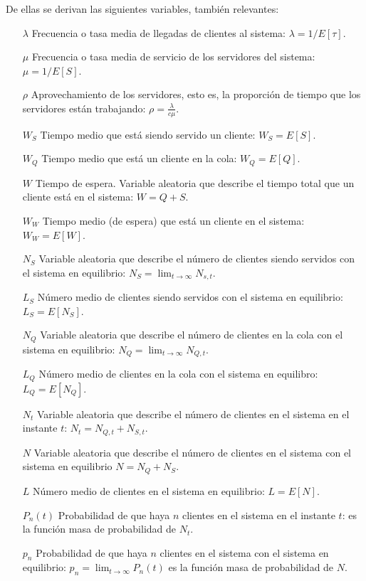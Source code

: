 \documentclass[a4paper,10pt]{scrartcl}
\theoremstyle{definition}
\theoremstyle{definition}
\numberwithin{equation}{section}
\begin{document}
	De ellas se derivan las siguientes variables, también relevantes:
	\begin{itemize}
		\item [$\lambda$]
		Frecuencia o tasa media de llegadas de clientes al sistema: $\lambda = 1/E[\tau]$.
		\item [$\mu$]
		Frecuencia o tasa media de servicio de los servidores del sistema: $\mu = 1/E[S]$.
		\item [$\rho$]
		Aprovechamiento de los servidores, esto es, la proporción de tiempo que los servidores están trabajando: $\rho = \frac{\lambda}{c\mu}$.
		\item [$W_S$]
		Tiempo medio que está siendo servido un cliente: $W_S  = E[S]$.
		\item [$W_Q$]
		Tiempo medio que está un cliente en la cola: $W_Q = E[Q]$.
		\item [$W$]
		Tiempo de espera. Variable aleatoria que describe el tiempo total que un cliente está en el sistema: $W = Q+S$.
		\item [$W_W$]
		Tiempo medio (de espera) que está un cliente en el sistema: $W_W = E[W]$.
		\item [$N_S$]
		Variable aleatoria que describe el número de clientes siendo servidos con el sistema en equilibrio: $N_S = \lim_{t \rightarrow \infty} N_{s,t}$.
		\item [$L_S$]
		Número medio de clientes siendo servidos con el sistema en equilibrio: \\ $L_S = E[N_S]$.
		\item [$N_Q$]
		Variable aleatoria que describe el número de clientes en la cola con el sistema en equilibrio: $N_Q = \lim_{t \rightarrow \infty} N_{Q,t}$.
		\item [$L_Q$]
		Número medio de clientes en la cola con el sistema en equilibro: $L_Q = E[N_Q]$.
		\item [$N_t$]
		Variable aleatoria que describe el número de clientes en el sistema en el instante $t$: $N_t = N_{Q,t} + N_{S,t}$.
		\item [$N$]
		Variable aleatoria que describe el número de clientes en el sistema con el sistema en equilibrio $N = N_Q + N_S$.
		\item [$L$]
		Número medio de clientes en el sistema en equilibrio: $L = E[N]$.
		\item [$P_n(t)$]
		Probabilidad de que haya $n$ clientes en el sistema en el instante $t$: es la función masa de probabilidad de $N_t$.
		\item [$p_n$]
		Probabilidad de que haya $n$ clientes en el sistema con el sistema en equilibrio: $p_n = \lim_{t \rightarrow \infty} P_n(t)$ es la función masa de probabilidad de $N$.
	\end{itemize}
	
\end{document}
